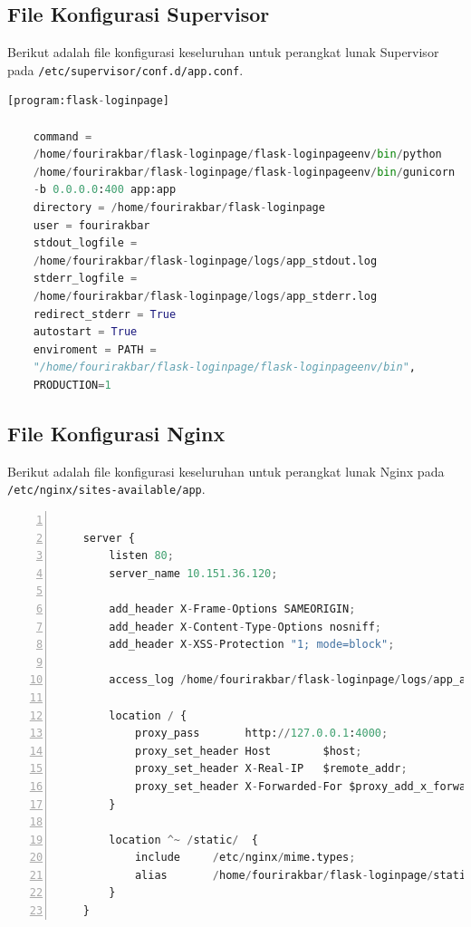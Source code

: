 \subsection{File Konfigurasi Supervisor}
Berikut adalah file konfigurasi keseluruhan untuk perangkat lunak Supervisor pada \texttt{/etc/supervisor/conf.d/app.conf}.\\

\begin{minipage}{\linewidth}
	\begin{lstlisting}[caption=Konfigurasi tambahan Supervisor,language=Python,label=konfigurasisupervisor]
	[program:flask-loginpage]
	
	command = 
	/home/fourirakbar/flask-loginpage/flask-loginpageenv/bin/python 
	/home/fourirakbar/flask-loginpage/flask-loginpageenv/bin/gunicorn 
	-b 0.0.0.0:400 app:app
	directory = /home/fourirakbar/flask-loginpage
	user = fourirakbar
	stdout_logfile = 
	/home/fourirakbar/flask-loginpage/logs/app_stdout.log
	stderr_logfile =
	/home/fourirakbar/flask-loginpage/logs/app_stderr.log
	redirect_stderr = True
	autostart = True
	enviroment = PATH = 
	"/home/fourirakbar/flask-loginpage/flask-loginpageenv/bin", 
	PRODUCTION=1
	\end{lstlisting}
\end{minipage}

\subsection{File Konfigurasi Nginx}

Berikut adalah file konfigurasi keseluruhan untuk perangkat lunak Nginx pada \texttt{/etc/nginx/sites-available/app}.\\
  
  \begin{lstlisting}[numbers=left, frame=single,tabsize=2,breaklines,caption={Konfigurasi tambahan untuk Nginx},label=konfigurasinginx, language=python]

	server {
		listen 80;
		server_name 10.151.36.120;
		
		add_header X-Frame-Options SAMEORIGIN;
		add_header X-Content-Type-Options nosniff;
		add_header X-XSS-Protection "1; mode=block";
		
		access_log /home/fourirakbar/flask-loginpage/logs/app_access.log;
		
		location / {
			proxy_pass       http://127.0.0.1:4000;
			proxy_set_header Host        $host;
			proxy_set_header X-Real-IP   $remote_addr;
			proxy_set_header X-Forwarded-For $proxy_add_x_forwarded_for;
		}
		
		location ^~ /static/  {
			include     /etc/nginx/mime.types;
			alias       /home/fourirakbar/flask-loginpage/static/;
		}  
	}

\end{lstlisting}

